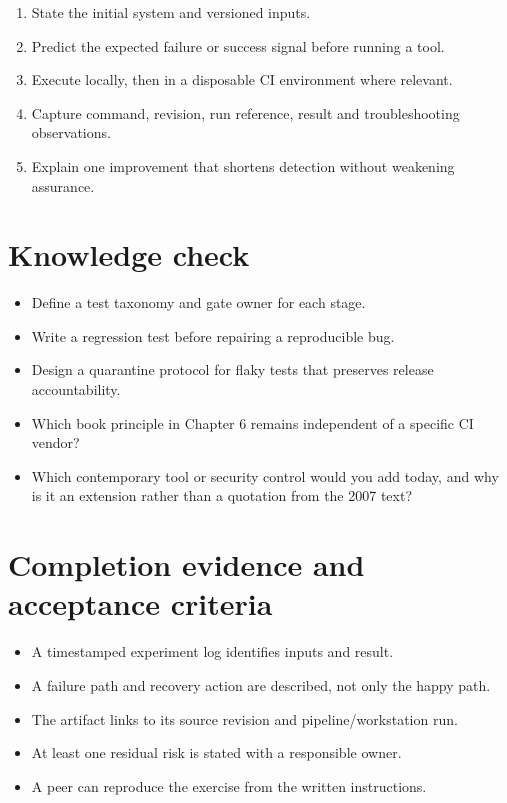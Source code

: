 \documentclass[11pt,letterpaper]{article}
\begin{document}
\begin{enumerate}
\item State the initial system and versioned inputs.
\item Predict the expected failure or success signal before running a tool.
\item Execute locally, then in a disposable CI environment where relevant.
\item Capture command, revision, run reference, result and troubleshooting observations.
\item Explain one improvement that shortens detection without weakening assurance.
\end{enumerate}
\section{Knowledge check}
\begin{itemize}
\item Define a test taxonomy and gate owner for each stage.
\item Write a regression test before repairing a reproducible bug.
\item Design a quarantine protocol for flaky tests that preserves release accountability.
\item Which book principle in Chapter 6 remains independent of a specific CI vendor?
\item Which contemporary tool or security control would you add today, and why is it an extension rather than a quotation from the 2007 text?
\end{itemize}
\section{Completion evidence and acceptance criteria}
\begin{itemize}
\item A timestamped experiment log identifies inputs and result.
\item A failure path and recovery action are described, not only the happy path.
\item The artifact links to its source revision and pipeline/workstation run.
\item At least one residual risk is stated with a responsible owner.
\item A peer can reproduce the exercise from the written instructions.
\end{itemize}
\end{document}
